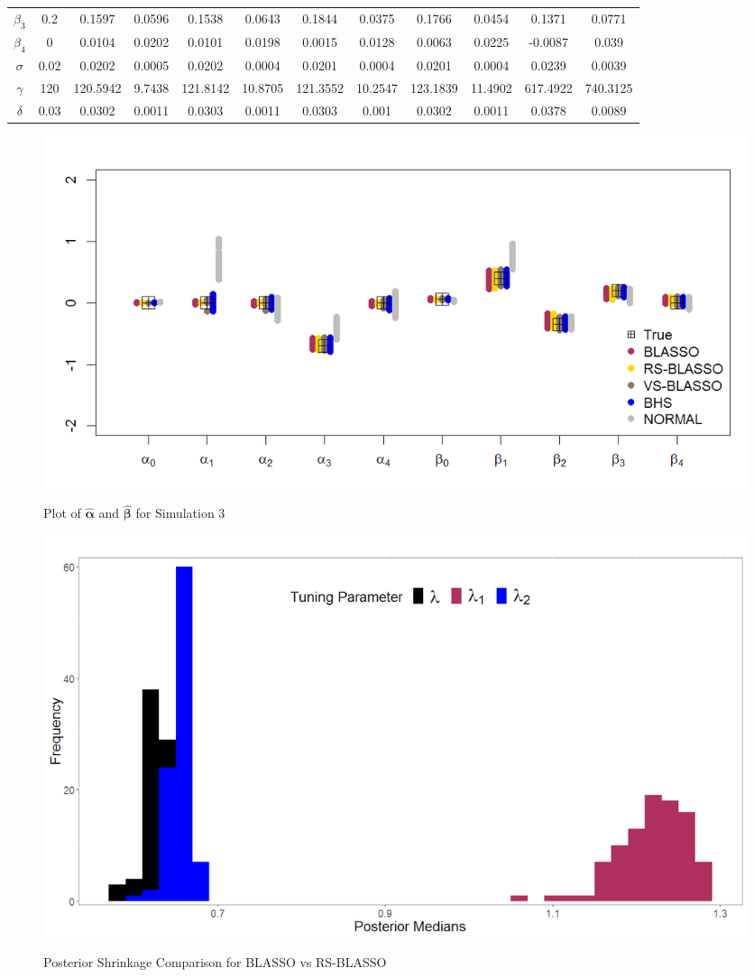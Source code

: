 \begin{table}
\begin{tabular}{cccccccccccc}
    $\beta_3$ & 0.2  & 0.1597 & 0.0596 & 0.1538 & 0.0643 & 0.1844 & 0.0375 & 0.1766 & 0.0454 & 0.1371 & 0.0771 \\
    $\beta_4$ & 0    & 0.0104 & 0.0202 & 0.0101 & 0.0198 & 0.0015 & 0.0128 & 0.0063 & 0.0225 & -0.0087 & 0.039 \\
    $\sigma$ & 0.02 & 0.0202 & 0.0005 & 0.0202 & 0.0004 & 0.0201 & 0.0004 & 0.0201 & 0.0004 & 0.0239 & 0.0039 \\
    $\gamma$ & 120  & 120.5942 & 9.7438 & 121.8142 & 10.8705 & 121.3552 & 10.2547 & 123.1839 & 11.4902 & 617.4922 & 740.3125 \\
    $\delta$ & 0.03 & 0.0302 & 0.0011 & 0.0303 & 0.0011 & 0.0303 & 0.001 & 0.0302 & 0.0011 & 0.0378 & 0.0089 \\
    \bottomrule
    \end{tabular}%
  \label{tab:blassobhssummary4}%
\end{table}%

\begin{figure}[!h]
	\centering
	      \caption{Plot of $\hat{\bm{\alpha}}$ and $\hat{\bm{\beta}}$ for Simulation 3}
      \includegraphics[scale=0.35]{blassovsbhs4}
      \label{fig:blvsbh4}
\end{figure}

\begin{figure}[!h]
	\centering
	      \caption{Posterior Shrinkage Comparison for BLASSO vs RS-BLASSO}
      \includegraphics[scale=0.30]{rslambda}
      \label{fig:lambdabox}
\end{figure}

